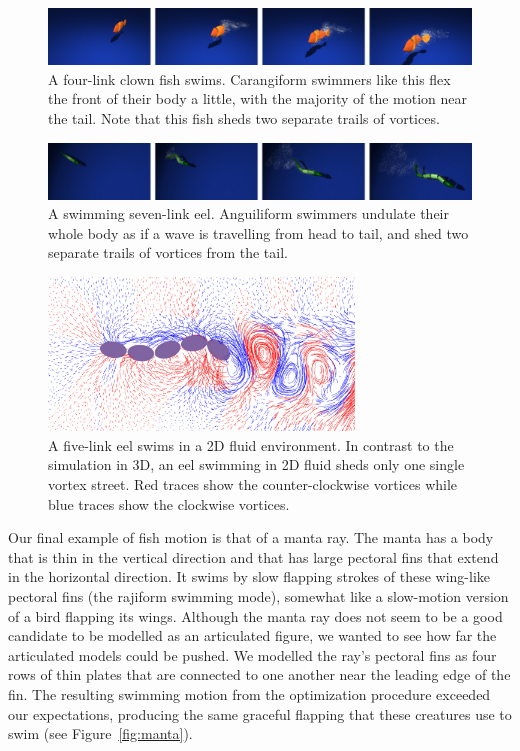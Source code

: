 \begin{figure}[t]
\centering
\includegraphics[width=\textwidth]{figures/fish.eps}
\caption{A four-link clown fish swims. Carangiform swimmers like this flex the front of their body a little, with the
majority of the motion near the tail. Note that this fish sheds two separate trails of vortices.}
\label{fig:fish}
\end{figure}

\begin{figure}[t]
\centering
\includegraphics[width=\textwidth]{figures/eel.eps}
\caption{A swimming seven-link eel. Anguiliform swimmers undulate their whole body as if a wave is travelling from head to tail, and shed two separate trails of vortices from the tail.}
\label{fig:eel}
\end{figure}


\begin{figure}[b]
\centering
\includegraphics[width=3.2in]{figures/eel2D.eps}
\caption{A five-link eel swims in a 2D fluid environment. In contrast to the simulation in 3D, an eel swimming in 2D fluid sheds only one single vortex street. Red traces show the counter-clockwise vortices while blue traces show the clockwise vortices.}
\label{fig:eel2D}
\end{figure}

Our final example of fish motion is that of a manta ray.  The manta has a
body that is thin in the vertical direction and that has large pectoral fins
that extend in the horizontal direction.  It swims by slow flapping strokes
of these wing-like pectoral fins (the rajiform swimming mode), somewhat like
a slow-motion version of a bird flapping its wings.  Although the manta ray
does not seem to be a good candidate to be modelled as an articulated
figure, we wanted to see how far the articulated models could be pushed.  We
modelled the ray's pectoral fins as four rows of thin plates that are
connected to one another near the leading edge of the fin.  The resulting
swimming motion from the optimization procedure exceeded our expectations,
producing the same graceful flapping that these creatures use to swim (see
Figure~\ref{fig:manta}).

